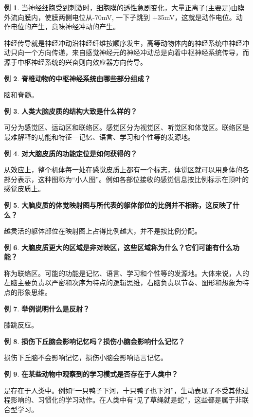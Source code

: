 \documentclass[UTF8]{article}
\theoremstyle{definition}
\newtheorem{example}{例}[section]
\begin{document}
\begin{example}
    当神经细胞受到刺激时，细胞膜的透性急剧变化，大量正离子(主要是)由膜外流向膜内，使膜两侧电位从-70mV, 一下子跳到 +35mV，这就是动作电位。动作电位的产生，意味神经冲动的产生。

    神经传导就是神经冲动沿神经纤维按顺序发生，高等动物体内的神经系统中神经冲动只向一个方向传递，来自感觉神经元的神经冲动总是向着中枢神经系统传导，而源于中枢神经系统的兴奋则向效应器方向传导。
\end{example}\begin{example}\textbf{脊椎动物的中枢神经系统由哪些部分组成？}
    
    脑和脊髓。
\end{example}\begin{example}\textbf{人类大脑皮质的结构大致是什么样的？}
    
    可分为感觉区、运动区和联络区。感觉区分为视觉区、听觉区和体觉区。联络区是最难解释的功能和特征---记忆、语言、学习和个性等的发源地。
\end{example}\begin{example}\textbf{对大脑皮质的功能定位是如何获得的？}
    
    从效应上，整个机体每一处在感觉皮质上都有一个标志，体觉区就可以用身体的各部分表示，这种图称为“小人图”。例如各部位接收的感觉信息按比例标示在顶叶的感觉皮质上。
\end{example}\begin{example}\textbf{大脑皮质的体觉映射图与所代表的躯体部位的比例并不相称，这反映了什么？}
    
    越灵活的躯体部位在映射图上占得比例越大，并不是按比例分配。
\end{example}\begin{example}\textbf{大脑皮质更大的区域是非对映区，这些区域称为什么？它们可能有什么功能？}
    
    称为联络区。可能的功能是记忆、语言、学习和个性等的发源地。大体来说，人的左脑主要负责以严密和次序为特点的逻辑思维，右脑负责以节奏、图形和想象为特点的形象思维。
\end{example}
\begin{example} \textbf{举例说明什么是反射？}
    
    膝跳反应。
    \end{example}
\begin{example} \textbf{损伤下丘脑会影响记忆吗？损伤小脑会影响什么记忆？}
    
    损伤下丘脑不会影响记忆，损伤小脑会影响语言记忆。
    \end{example}
\begin{example} \textbf{在某些动物中观察到的学习模式是否存在于人类中？}

    是存在于人类中。例如“一只鸭子下河，十只鸭子也下河”，生动表现了不受其他过程影响的、习惯化的学习动作。在人类中有“见了草绳就是蛇”，这些都是属于非联合型学习。
\end{example}
\end{document}
